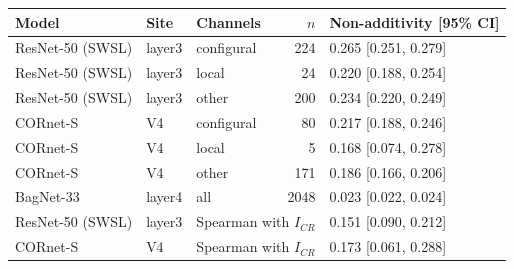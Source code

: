 \begin{tabular}{lllrl}
\hline
Model & Site & Channels & $n$ & Non-additivity [95\% CI] \\
\hline
ResNet-50 (SWSL) & layer3 & configural & 224 & 0.265 [0.251, 0.279] \\
ResNet-50 (SWSL) & layer3 & local & 24 & 0.220 [0.188, 0.254] \\
ResNet-50 (SWSL) & layer3 & other & 200 & 0.234 [0.220, 0.249] \\
CORnet-S & V4 & configural & 80 & 0.217 [0.188, 0.246] \\
CORnet-S & V4 & local & 5 & 0.168 [0.074, 0.278] \\
CORnet-S & V4 & other & 171 & 0.186 [0.166, 0.206] \\
BagNet-33 & layer4 & all & 2048 & 0.023 [0.022, 0.024] \\
\hline
ResNet-50 (SWSL) & layer3 & \multicolumn{2}{l}{Spearman with $I_{CR}$} & 0.151 [0.090, 0.212] \\
CORnet-S & V4 & \multicolumn{2}{l}{Spearman with $I_{CR}$} & 0.173 [0.061, 0.288] \\
\hline
\end{tabular}